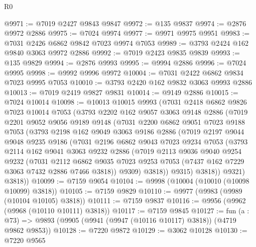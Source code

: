 \begin{lexlean}{R0}
\begin{coremodule}
@9971 := @7019 @2427 @9843 @9847
@9972 := @135 @9837
@9974 := @2876 @9972 @2886
@9975 := @7024 @9974
@9977 := @9971 @9975 @9951
@9983 := @7031 @2426 @6862 @9842 @7023 @9974 @7053
@9989 := @3793 @2424 @162 @9840 @3063 @9972 @2886
@9992 := @7019 @2423 @9835 @9839
@9993 := @135 @9829
@9994 := @2876 @9993
@9995 := @9994 @2886
@9996 := @7024 @9995
@9998 := @9992 @9996 @9972
@10004 := @7031 @2422 @6862 @9834 @7023 @9995 @7053
@10010 := @3793 @2420 @162 @9832 @3063 @9993 @2886
@10013 := @7019 @2419 @9827 @9831
@10014 := @9149 @2886
@10015 := @7024 @10014
@10098 := @10013
    @10015
    @9993
    (@7031
      @2418
      @6862
      @9826
      @7023
      @10014
      @7053
      (@3793
        @2202
        @162
        @9057
        @3063
        @9148
        @2886
        (@7019
          @2201
          @9052
          @9056
          @9189
          @9148
          (@7031
            @2200
            @6862
            @9051
            @7023
            @9188
            @7053
            (@3793
              @2198
              @162
              @9049
              @3063
              @9186
              @2886
              (@7019
                @2197
                @9044
                @9048
                @9235
                @9186
                (@7031
                  @2196
                  @6862
                  @9043
                  @7023
                  @9234
                  @7053
                  (@3793
                    @2114
                    @162
                    @9041
                    @3063
                    @9232
                    @2886
                    (@7019
                      @2113
                      @9036
                      @9040
                      @9254
                      @9232
                      (@7031
                        @2112
                        @6862
                        @9035
                        @7023
                        @9253
                        @7053
                        (@7437 @162 @7229 @3063 @7432 @2886 @7466 @3818))
                      @9309)
                    @3818))
                @9315)
              @3818))
          @9321)
        @3818))
@10099 := @7159 @9054
@10104 := @9998 (@10004 (@10010 (@10098 @10099) @3818))
@10105 := @7159 @9829
@10110 := @9977 (@9983 (@9989 (@10104 @10105) @3818))
@10111 := @7159 @9837
@10116 := @9956 (@9962 (@9968 (@10110 @10111) @3818))
@10117 := @7159 @9845
@10127 := fun (a : @73) => @9893 (@9905 (@9941 (@9947 (@10116 @10117) @3818)) (@4719 @9862 @9853))
@10128 := @7220 @9872
@10129 := @3062 @10128
@10130 := @7220 @9565

\end{coremodule}
\end{lexlean}
